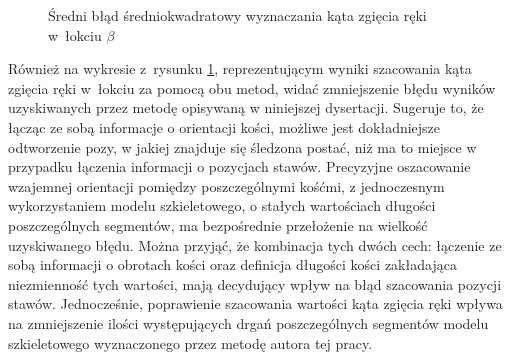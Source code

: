 																															
\begin{savenotes}
	\begin{figure}[hbp]
		\centering
		\caption{Średni błąd średniokwadratowy wyznaczania kąta zgięcia ręki w~łokciu $\beta$}
		\label{fig:experiments:angle:summary}
	\end{figure}
\end{savenotes}


Również na wykresie z~rysunku \ref{fig:experiments:angle:summary}, reprezentującym wyniki szacowania kąta zgięcia ręki w~łokciu za pomocą obu metod, widać zmniejszenie błędu wyników uzyskiwanych przez metodę opisywaną w niniejszej dysertacji. Sugeruje to, że łącząc ze sobą informacje o orientacji kości, możliwe jest dokładniejsze odtworzenie pozy, w jakiej znajduje się śledzona postać, niż ma to miejsce w przypadku łączenia informacji o pozycjach stawów. Precyzyjne oszacowanie wzajemnej orientacji pomiędzy poszczególnymi kośćmi, z jednoczesnym wykorzystaniem modelu szkieletowego, o stałych wartościach długości poszczególnych segmentów, ma bezpośrednie przełożenie na wielkość uzyskiwanego błędu. Można przyjąć, że kombinacja tych dwóch cech: łączenie ze sobą informacji o obrotach kości oraz definicja długości kości zakładająca niezmienność tych wartości, mają decydujący wpływ na błąd szacowania pozycji stawów. Jednocześnie, poprawienie szacowania wartości kąta zgięcia ręki wpływa na zmniejszenie ilości występujących drgań poszczególnych segmentów modelu szkieletowego wyznaczonego przez metodę autora tej pracy.